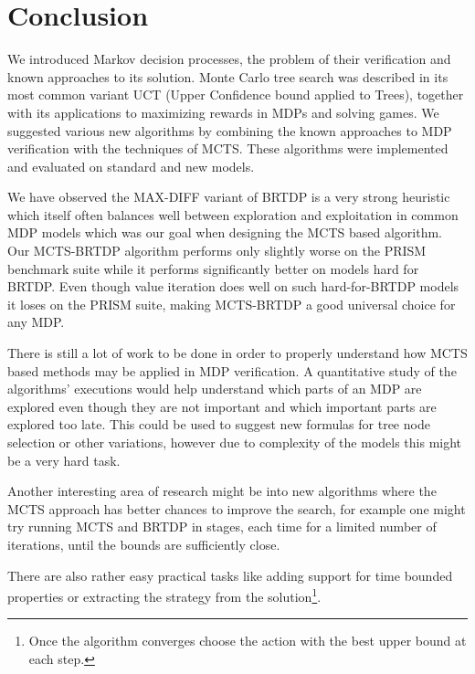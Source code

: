 \chapter{Conclusion}

We introduced Markov decision processes,
the problem of their verification and known approaches to its solution.
Monte Carlo tree search was described in its most common variant UCT
(Upper Confidence bound applied to Trees),
together with its applications to maximizing rewards in MDPs and solving
games.
We suggested various new algorithms by combining the known
approaches to MDP verification with the techniques of MCTS. These
algorithms were implemented and evaluated on standard and new models.

We have observed the MAX-DIFF variant of BRTDP is a very strong
heuristic which itself often balances well between exploration and
exploitation in common MDP models which was our goal when designing the
MCTS based algorithm. Our MCTS-BRTDP algorithm
performs only slightly worse on the PRISM benchmark suite while it
performs significantly better on models hard for BRTDP. Even though
value iteration does well on such hard-for-BRTDP models it loses on the
PRISM suite, making MCTS-BRTDP a good universal choice for any MDP.

There is still a lot of work to be done in order to properly understand
how MCTS based methods may be applied in MDP verification. A
quantitative study of the algorithms' executions would help understand
which parts
of an MDP are explored even though they are not important and which
important parts are explored too late. This could be used to suggest new
formulas for tree node selection or other variations, however due to
complexity of the models this might be a very hard task.

Another interesting area of research might be into
new algorithms where the MCTS approach has better chances to
improve the search, for example one might try running MCTS and BRTDP in
stages, each time for a limited number of iterations, until the bounds
are sufficiently close.

There
are also rather easy practical tasks like adding support for time
bounded properties or extracting the strategy from the
solution\footnote{Once
the algorithm converges choose the action with the best upper bound at
each step.}.
